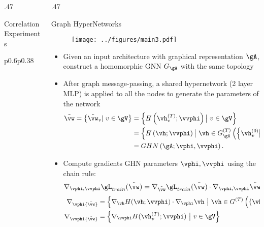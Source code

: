 \documentclass[final,t]{beamer}
\begin{document}
\begin{frame}{}
\begin{columns}[t]
\begin{column}{.47\linewidth}
\begin{exampleblock}{Correlation Experiments}
\begin{tabular}{p{0.6\textwidth}p{0.38\textwidth}}
			\end{tabular}
   \end{exampleblock}
    



\end{column}
\vspace{0pt}



\begin{column}{.47\linewidth}
    \vskip -0.5cm
    
    \begin{exampleblock}{Graph HyperNetworks}
	\begin{figure}
		\texttt{[image: ../figures/main3.pdf]}
	\end{figure}    
	\begin{itemize}
		\item Given an input architecture with graphical representation $\gA$, 
				construct a homomorphic GNN $G_\gA$ with the same topology
		\item After graph message-passing, a shared hypernetwork (2 layer MLP) is applied to all the nodes to generate the parameters of the network
		\begin{align*}
			\tilde{\vw}=\left\{\tilde{\vw}_v | \ v \in \gV  \right\}
			   &= \left\{H\left(\vh_v^{(T)}; \vvphi\right) \big| \ v \in \gV  \right\} \\
			  &=  \left\{H\left(\vh; \vvphi\right) \big| \ \vh \in G_\gA^{(T)}\left(\left\{\vh_v^{(0)} \big| v \in \gV \right\}; \vphi\right)\right\} \\
			  &= GHN\left(\gA; \vphi, \vvphi\right).
		\end{align*}
		\item Compute gradients GHN parameters
				$\vphi, \vvphi$ using the chain rule:
				\begin{equation*}
				\nabla_{\vphi, \vvphi}{\gL_{train}(\tilde{\vw})} = \nabla_{\tilde{\vw}}{
				\gL_{train}(\tilde{\vw})} \cdot \nabla_{\vphi, \vvphi}{\tilde{\vw}}
				\end{equation*}
				\begin{align*}
				 \nabla_\vphi{\tilde{\vw}} &= \left\{ \nabla_\vh H( \vh; \vvphi) \cdot \nabla_\vphi \vh \ \big| \ \vh \in G^{(T)} \left( \{\vh_v^{(0)}\}, \gA, \vphi \right) \right\}, \\ 
				 \nabla_\vvphi{\tilde{\vw}} &= \left\{ \nabla_\vvphi H( \vh_v^{(T)}; \vvphi) \ \big| \ v \in \gV \right\} 
				\end{align*}
	\end{itemize}
	\end{exampleblock}
	

\end{column}
\end{columns}
\end{frame}
\end{document}
